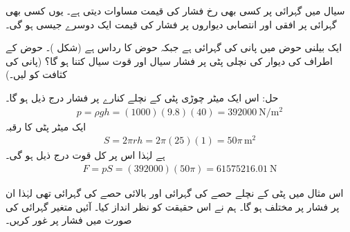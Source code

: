 سیال میں  گہرائی پر کسی بھی رخ فشار کی قیمت  مساوات  دیتی ہے۔ یوں کسی بھی گہرائی پر افقی اور انتصابی دیواروں پر فشار کی قیمت ایک دوسرے جیسی ہو گی۔ 

ایک بیلنی حوض میں پانی کی گہرائی   ہے  جبکہ حوض کا رداس  ہے (شکل )۔ حوض کے اطراف کی دیوار کی نچلی   پٹی  پر فشار سیال اور قوت سیال کتنا ہو گا؟ (پانی کی کثافت کو  لیں۔)

حل: \quad
 اس ایک میٹر چوڑی پٹی کے  نچلے کنارے پر فشار درج ذیل ہو گا۔
\begin{align*}
p=\rho g h=(1000)(9.8)(40)=\SI{392000}{\newton\per\meter\squared}
\end{align*}
ایک میٹر پٹی کا رقبہ
\begin{align*}
S=2\pi r h=2\pi(25)(1)=50\pi\,\si{\meter\squared}
\end{align*}
ہے لہٰذا اس پر کل قوت درج ذیل ہو گی۔
\begin{align*}
F=pS=(392000)(50\pi)=\SI{61575216.01}{\newton}
\end{align*}

اس مثال میں پٹی کے نچلے حصے کی گہرائی  اور بالائی حصے کی گہرائی  تھی  لہٰذا ان پر فشار پر مختلف ہو گا۔ ہم نے اس حقیقت کو نظر انداز کیا۔ آئیں متغیر گہرائی کی صورت میں فشار پر غور کریں۔

